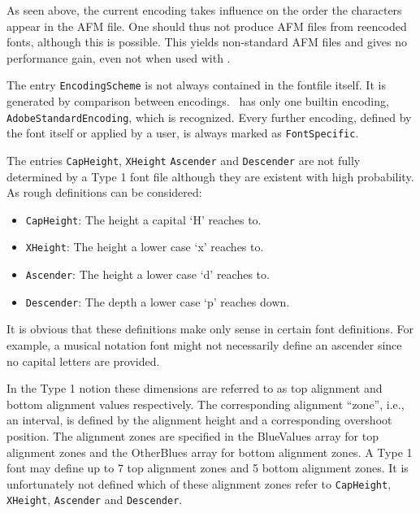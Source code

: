 As seen above, the current encoding takes influence on the order the
characters appear in the AFM file. One should thus not produce AFM files from
reencoded fonts, although this is possible. This yields non-standard AFM files
and gives no performance gain, even not when used with \tonelib.

The entry \verb+EncodingScheme+ is not always contained in the fontfile
itself. It is generated by comparison between encodings. \tonelib\ has only one
builtin encoding, \verb+AdobeStandardEncoding+, which
is recognized. Every further encoding, defined
by the font itself or applied by a user, is always marked as
\verb+FontSpecific+. 

The entries \verb+CapHeight+, \verb+XHeight+ \verb+Ascender+ and
\verb+Descender+ are not fully determined by a Type 1 font file
although they are existent with high probability. As rough definitions
can be considered:
\begin{itemize}
\item \verb+CapHeight+: The height a capital `H' reaches to.
\item \verb+XHeight+: The height a lower case `x' reaches to.
\item \verb+Ascender+: The height a lower case `d' reaches to.
\item \verb+Descender+: The depth a lower case `p' reaches down.
\end{itemize}
It is obvious that these definitions make only sense in certain font
definitions. For example, a musical notation font might not necessarily
define an ascender since no capital letters are provided. 

In the Type 1 notion these dimensions are referred to as top alignment
and bottom alignment values respectively. The corresponding alignment
``zone'', i.e., an interval, is defined by the alignment height and a
corresponding overshoot position. The alignment zones are specified in
the BlueValues array for top alignment zones and the OtherBlues
array for bottom alignment zones. A Type 1 font may define up to 7 top
alignment zones and 5 bottom alignment zones. It is unfortunately not
defined which of these alignment zones refer to \verb+CapHeight+,
\verb+XHeight+, \verb+Ascender+ and \verb+Descender+. 

